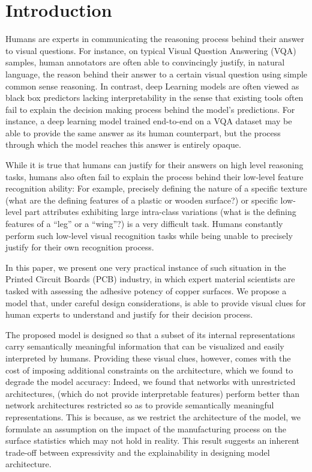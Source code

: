 \documentclass[10pt,twocolumn,letterpaper]{article}
\begin{document}
\section{Introduction}

Humans are experts in communicating the reasoning process behind their answer to visual questions.
For instance, on typical Visual Question Answering (VQA) samples\cite{antol2015vqa}\cite{zhang2016yin}\cite{goyal2017making}, 
human annotators are often able to convincingly justify, in natural language, the reason 
behind their answer to a certain visual question using simple common sense reasoning.
In contrast, deep Learning models are often viewed as black box predictors lacking interpretability 
in the sense that existing tools often fail to explain the decision making process behind the model’s predictions.
For instance, a deep learning model trained end-to-end on a VQA dataset may be able to provide the same answer as its
human counterpart, but the process through which the model reaches this answer is entirely opaque.

While it is true that humans can justify for their answers on high level reasoning tasks, 
humans also often fail to explain the process behind their low-level feature recognition ability:
For example, precisely defining the nature of a specific texture 
(what are the defining features of a plastic or wooden surface?) 
or specific low-level part attributes exhibiting large intra-class variations 
(what is the defining features of a ``leg'' or a ``wing''?) is a very difficult task.
Humans constantly perform such low-level visual recognition tasks 
while being unable to precisely justify for their own recognition process.
	
In this paper, we present one very practical instance of such situation in the Printed Circuit Boards (PCB) industry, 
in which expert material scientists are tasked with assessing the adhesive potency of copper surfaces.
We propose a model that, under careful design considerations, is able to provide visual clues 
for human experts to understand and justify for their decision process.
	
The proposed model is designed so that a subset of its internal representations carry semantically meaningful 
information that can be visualized and easily interpreted by humans.
Providing these visual clues, however, comes with the cost of imposing additional constraints on the architecture,
which we found to degrade the model accuracy:
Indeed, we found that networks with unrestricted architectures, 
(which do not provide interpretable features)
perform better than network architectures restricted so as to provide 
semantically meaningful representations.
This is because, as we restrict the architecture of the model, 
we formulate an assumption on the impact of the manufacturing process 
on the surface statistics which may not hold in reality.
This result suggests an inherent trade-off between  
expressivity and the explainability in designing model architecture.
	
\end{document}
